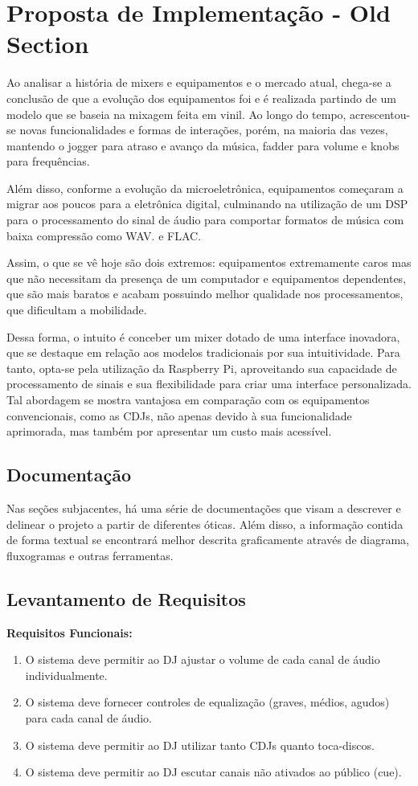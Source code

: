 \section{Proposta de Implementação - Old Section}
Ao analisar a história de mixers e equipamentos e o mercado atual, chega-se a conclusão de que a evolução dos equipamentos foi e é realizada partindo de um modelo que se baseia na mixagem feita em vinil. Ao longo do tempo, acrescentou-se novas funcionalidades e formas de interações, porém, na maioria das vezes, mantendo o jogger para atraso e avanço da música, fadder para volume e knobs para frequências.
\par
Além disso, conforme a evolução da microeletrônica, equipamentos começaram a migrar aos poucos para a eletrônica digital, culminando na utilização de um DSP para o processamento do sinal de áudio para comportar formatos de música com baixa compressão como WAV. e FLAC. 
\par
Assim, o que se vê hoje são dois extremos: equipamentos extremamente caros mas que não necessitam da presença de um computador e equipamentos dependentes, que são mais baratos e acabam possuindo melhor qualidade nos processamentos, que dificultam a mobilidade.
\par
Dessa forma, o intuito é conceber um mixer dotado de uma interface inovadora, que se destaque em relação aos modelos tradicionais por sua intuitividade. Para tanto, opta-se pela utilização da Raspberry Pi, aproveitando sua capacidade de processamento de sinais e sua flexibilidade para criar uma interface personalizada. Tal abordagem se mostra vantajosa em comparação com os equipamentos convencionais, como as CDJs, não apenas devido à sua funcionalidade aprimorada, mas também por apresentar um custo mais acessível.

\subsection{Documentação}
Nas seções subjacentes, há uma série de documentações que visam a descrever e delinear o projeto a partir de diferentes óticas. Além disso, a informação contida de forma textual se encontrará melhor descrita graficamente através de diagrama, fluxogramas e outras ferramentas.

\subsection{Levantamento de Requisitos}
\textbf{Requisitos Funcionais:}
\begin{enumerate}[label=\textbullet]
\item O sistema deve permitir ao DJ ajustar o volume de cada canal de áudio individualmente.
\item O sistema deve fornecer controles de equalização (graves, médios, agudos) para cada canal de áudio.
\item O sistema deve permitir ao DJ utilizar tanto CDJs quanto toca-discos.
\item O sistema deve permitir ao DJ escutar canais não ativados ao público (cue).

\end{enumerate}

